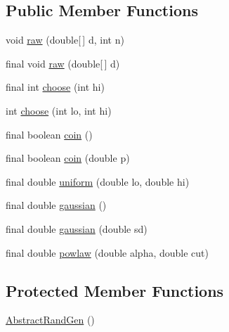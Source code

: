\subsection*{Public Member Functions}
\begin{DoxyCompactItemize}
\item 
void \hyperlink{classnet_1_1sf_1_1jclec_1_1util_1_1random_1_1_abstract_rand_gen_ab62c6eb80397722ae312482efdd41992}{raw} (double\mbox{[}$\,$\mbox{]} d, int n)
\item 
final void \hyperlink{classnet_1_1sf_1_1jclec_1_1util_1_1random_1_1_abstract_rand_gen_a7ab41eb7f7603618a1945bbc0d78b419}{raw} (double\mbox{[}$\,$\mbox{]} d)
\item 
final int \hyperlink{classnet_1_1sf_1_1jclec_1_1util_1_1random_1_1_abstract_rand_gen_a55c6e19b359472839a05f3813c7f2e08}{choose} (int hi)
\item 
int \hyperlink{classnet_1_1sf_1_1jclec_1_1util_1_1random_1_1_abstract_rand_gen_acf07aa5a639e6c8fdea7122de17948e3}{choose} (int lo, int hi)
\item 
final boolean \hyperlink{classnet_1_1sf_1_1jclec_1_1util_1_1random_1_1_abstract_rand_gen_a351e4fb64b629ee1778f739ab54c4c74}{coin} ()
\item 
final boolean \hyperlink{classnet_1_1sf_1_1jclec_1_1util_1_1random_1_1_abstract_rand_gen_a0b2cc6c273c2112c4f7f39c126a7b10b}{coin} (double p)
\item 
final double \hyperlink{classnet_1_1sf_1_1jclec_1_1util_1_1random_1_1_abstract_rand_gen_a24478e919b8d389d4e26b52f2532307c}{uniform} (double lo, double hi)
\item 
final double \hyperlink{classnet_1_1sf_1_1jclec_1_1util_1_1random_1_1_abstract_rand_gen_a249bd51a907c6d0f8792f2964bef7924}{gaussian} ()
\item 
final double \hyperlink{classnet_1_1sf_1_1jclec_1_1util_1_1random_1_1_abstract_rand_gen_a54c77e3e2d11e70b64ba4541c5be5f13}{gaussian} (double sd)
\item 
final double \hyperlink{classnet_1_1sf_1_1jclec_1_1util_1_1random_1_1_abstract_rand_gen_a943833520962f5db5c4a748db272dad7}{powlaw} (double alpha, double cut)
\end{DoxyCompactItemize}
\subsection*{Protected Member Functions}
\begin{DoxyCompactItemize}
\item 
\hyperlink{classnet_1_1sf_1_1jclec_1_1util_1_1random_1_1_abstract_rand_gen_af19cc77f3b73602085356ccd124c678b}{Abstract\-Rand\-Gen} ()
\end{DoxyCompactItemize}
